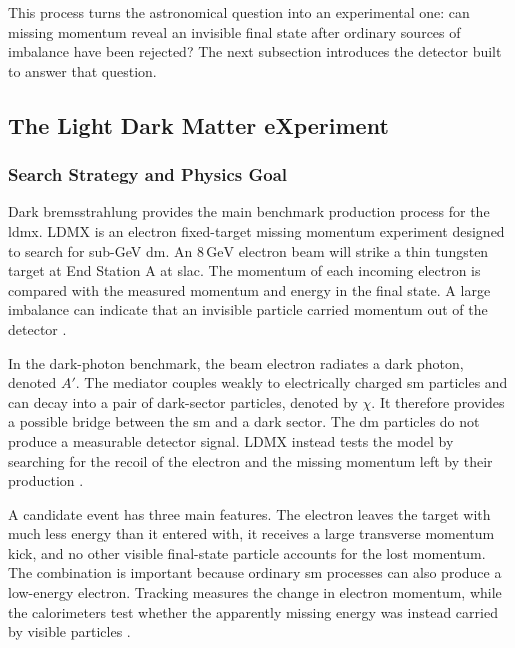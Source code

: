 This process turns the astronomical question into an experimental one: can
missing momentum reveal an invisible final state after ordinary sources of
imbalance have been rejected? The next subsection introduces the detector built
to answer that question.

\subsection{The Light Dark Matter eXperiment}
\label{sec:ldmx}

\subsubsection{Search Strategy and Physics Goal}

Dark bremsstrahlung provides the main benchmark production process for the
\gls{ldmx}. LDMX is an electron fixed-target
\gls{missing momentum experiment} designed to search for sub-GeV \gls{dm}.
An \(8\,\mathrm{GeV}\) electron beam will strike a thin tungsten target at
End Station A at \gls{slac}. The momentum of each incoming electron is
compared with the measured momentum and energy in the final state. A large
imbalance can indicate that an invisible particle carried momentum out of
the detector \cite{ldmx2025-overview}.

In the dark-photon benchmark, the beam electron radiates a
\gls{dark photon}, denoted \(A'\). The mediator couples weakly to electrically
charged \gls{sm} particles and can decay into a pair of dark-sector particles,
denoted by \(\chi\). It therefore provides a possible bridge between the
\gls{sm} and a dark sector. The \gls{dm} particles do not produce a
measurable detector signal. LDMX instead tests the model by searching for the
recoil of the electron and the missing momentum left by their production
\cite{akesson2018-ldmx,ldmx2025-overview}.

A candidate event has three main features. The electron leaves the target
with much less energy than it entered with, it receives a large transverse
momentum kick, and no other visible final-state particle accounts for the
lost momentum. The combination is important because ordinary
\gls{sm} processes can also produce a low-energy electron. Tracking measures
the change in electron momentum, while the calorimeters test whether the
apparently missing energy was instead carried by visible particles
\cite{ldmx2025-overview}.

